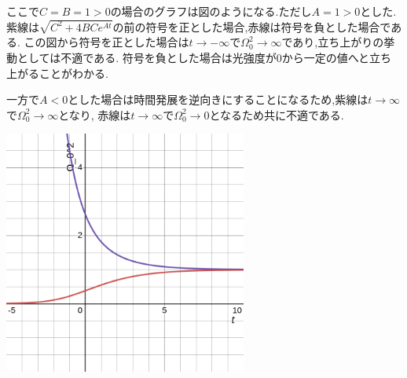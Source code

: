\documentclass[uplatex,a4j,11pt,dvipdfmx]{jsarticle}
\makeatletter
\def\fgcaption{\def\@captype{figure}\caption}
\makeatother
\begin{document}
ここで$C=B=1>0$の場合のグラフは図のようになる.ただし$A=1>0$とした.紫線は$\sqrt{C^2+4BCe^{At}}$の前の符号を正とした場合,赤線は符号を負とした場合である.
この図から符号を正とした場合は$t\rightarrow-\infty$で$\Omega_0^2\rightarrow\infty$であり,立ち上がりの挙動としては不適である.
符号を負とした場合は光強度が$0$から一定の値へと立ち上がることがわかる.

一方で$A<0$とした場合は時間発展を逆向きにすることになるため,紫線は$t\rightarrow\infty$で$\Omega_0^2\rightarrow\infty$となり,
赤線は$t\rightarrow\infty$で$\Omega_0^2\rightarrow0$となるため共に不適である.
\begin{center}
  \includegraphics[width=8cm]{desmos-graph.png}
  \fgcaption{$A=B=C=1$のときのグラフ,紫線は符号を正とした場合,赤線は符号を負とした場合}
\end{center}
\end{document}

